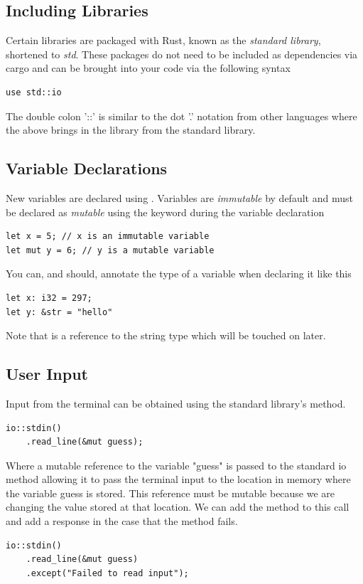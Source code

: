 \documentclass[]{article}
\begin{document}
\subsection{Including Libraries}

Certain libraries are packaged with Rust, known as the \textit{standard library}, shortened to \textit{std}.
These packages do not need to be included as dependencies via cargo and can be brought into your code via the following syntax
\begin{verbatim}
use std::io
\end{verbatim}
The double colon '::' is similar to the dot '.' notation from other languages where the above brings in the  library from the standard library.
\subsection{Variable Declarations}

New variables are declared using .
Variables are \emph{immutable} by default and must be declared as \textit{mutable} using the keyword  during the variable declaration
\begin{verbatim}
let x = 5; // x is an immutable variable
let mut y = 6; // y is a mutable variable
\end{verbatim}
You can, and should, annotate the type of a variable when declaring it like this
\begin{verbatim}
let x: i32 = 297;
let y: &str = "hello"
\end{verbatim}
Note that  is a reference to the string type which will be touched on later.
\subsection{User Input}

Input from the terminal can be obtained using the standard library's  method.
\begin{verbatim}
io::stdin()
    .read_line(&mut guess);
\end{verbatim}
Where a mutable reference to the variable "guess" is passed to the standard io method allowing it to pass the terminal input to the location in memory where the variable guess is stored.
This reference must be mutable because we are changing the value stored at that location.
We can add the  method to this call and add a response in the case that the method fails.
\begin{verbatim}
io::stdin()
    .read_line(&mut guess)
    .except("Failed to read input");
\end{verbatim}
\end{document}
